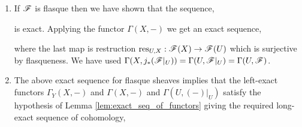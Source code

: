 \documentclass[12pt]{article}
\begin{document}
\begin{enumerate}
\item If $\mathscr{F}$ is flasque then we have shown that the sequence,
\begin{center}
\end{center}
is exact. Applying the functor $\Gamma(X, -)$ we get an exact sequence,
\begin{center}
\end{center}
where the last map is restruction $\mathrm{res}_{U,X} : \mathscr{F}(X) \to \mathscr{F}(U)$ which is surjective by flasqueness. We have used $\Gamma(X, j_* (\mathscr{F} |_U)) = \Gamma(U, \mathscr{F}|_U) = \Gamma(U, \mathscr{F})$. 


\item The above exact sequence for flasque sheaves implies that the left-exact functors $\Gamma_Y(X, -)$ and $\Gamma(X, -)$ and $\Gamma(U, (-)|_U)$ satisfy the hypothesis of Lemma \ref{lem:exact_seq_of_functors} giving the required long-exact sequence of cohomology,
\begin{center}
\end{center}


\end{enumerate}
\end{document}
